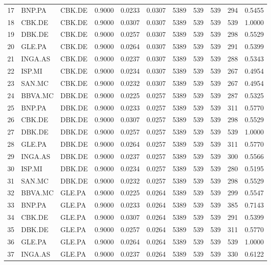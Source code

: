 \begin{table}
\begin{tabular}{lllrrrrrrrr}
17 & BNP.PA & CBK.DE & 0.9000 & 0.0233 & 0.0307 & 5389 & 539 & 539 & 294 & 0.5455 \\
18 & CBK.DE & CBK.DE & 0.9000 & 0.0307 & 0.0307 & 5389 & 539 & 539 & 539 & 1.0000 \\
19 & DBK.DE & CBK.DE & 0.9000 & 0.0257 & 0.0307 & 5389 & 539 & 539 & 298 & 0.5529 \\
20 & GLE.PA & CBK.DE & 0.9000 & 0.0264 & 0.0307 & 5389 & 539 & 539 & 291 & 0.5399 \\
21 & INGA.AS & CBK.DE & 0.9000 & 0.0237 & 0.0307 & 5389 & 539 & 539 & 288 & 0.5343 \\
22 & ISP.MI & CBK.DE & 0.9000 & 0.0234 & 0.0307 & 5389 & 539 & 539 & 267 & 0.4954 \\
23 & SAN.MC & CBK.DE & 0.9000 & 0.0232 & 0.0307 & 5389 & 539 & 539 & 267 & 0.4954 \\
24 & BBVA.MC & DBK.DE & 0.9000 & 0.0225 & 0.0257 & 5389 & 539 & 539 & 287 & 0.5325 \\
25 & BNP.PA & DBK.DE & 0.9000 & 0.0233 & 0.0257 & 5389 & 539 & 539 & 311 & 0.5770 \\
26 & CBK.DE & DBK.DE & 0.9000 & 0.0307 & 0.0257 & 5389 & 539 & 539 & 298 & 0.5529 \\
27 & DBK.DE & DBK.DE & 0.9000 & 0.0257 & 0.0257 & 5389 & 539 & 539 & 539 & 1.0000 \\
28 & GLE.PA & DBK.DE & 0.9000 & 0.0264 & 0.0257 & 5389 & 539 & 539 & 311 & 0.5770 \\
29 & INGA.AS & DBK.DE & 0.9000 & 0.0237 & 0.0257 & 5389 & 539 & 539 & 300 & 0.5566 \\
30 & ISP.MI & DBK.DE & 0.9000 & 0.0234 & 0.0257 & 5389 & 539 & 539 & 280 & 0.5195 \\
31 & SAN.MC & DBK.DE & 0.9000 & 0.0232 & 0.0257 & 5389 & 539 & 539 & 298 & 0.5529 \\
32 & BBVA.MC & GLE.PA & 0.9000 & 0.0225 & 0.0264 & 5389 & 539 & 539 & 299 & 0.5547 \\
33 & BNP.PA & GLE.PA & 0.9000 & 0.0233 & 0.0264 & 5389 & 539 & 539 & 385 & 0.7143 \\
34 & CBK.DE & GLE.PA & 0.9000 & 0.0307 & 0.0264 & 5389 & 539 & 539 & 291 & 0.5399 \\
35 & DBK.DE & GLE.PA & 0.9000 & 0.0257 & 0.0264 & 5389 & 539 & 539 & 311 & 0.5770 \\
36 & GLE.PA & GLE.PA & 0.9000 & 0.0264 & 0.0264 & 5389 & 539 & 539 & 539 & 1.0000 \\
37 & INGA.AS & GLE.PA & 0.9000 & 0.0237 & 0.0264 & 5389 & 539 & 539 & 330 & 0.6122 \\

\end{tabular}
\end{table}
